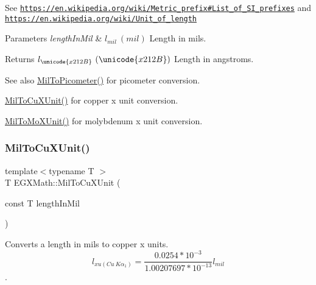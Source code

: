 See \href{https://en.wikipedia.org/wiki/Metric_prefix#List_of_SI_prefixes}{\tt https\+://en.\+wikipedia.\+org/wiki/\+Metric\+\_\+prefix\#\+List\+\_\+of\+\_\+\+S\+I\+\_\+prefixes} and \href{https://en.wikipedia.org/wiki/Unit_of_length}{\tt https\+://en.\+wikipedia.\+org/wiki/\+Unit\+\_\+of\+\_\+length} 
\begin{DoxyParams}{Parameters}
{\em length\+In\+Mil} & $ l_{mil}\ (mil)$ Length in mils. \\
\hline
\end{DoxyParams}
\begin{DoxyReturn}{Returns}
$ l_{\unicode{x212B}}\ (\unicode{x212B})$ Length in angstroms. 
\end{DoxyReturn}
\begin{DoxySeeAlso}{See also}
\mbox{\hyperlink{group___e_g_x_math-_conversions-_length_conversions-_imperial-_mil-_s_i_ga29a85f8ec2e5cf4d963468f882de8447}{Mil\+To\+Picometer()}} for picometer conversion. 

\mbox{\hyperlink{group___e_g_x_math-_conversions-_length_conversions-_imperial-_mil-_non-_s_i_ga92f713e3dddc0a45caa3fc6b5e8ca442}{Mil\+To\+Cu\+X\+Unit()}} for copper x unit conversion. 

\mbox{\hyperlink{group___e_g_x_math-_conversions-_length_conversions-_imperial-_mil-_non-_s_i_ga673efde012cc982641b2eb1266f88f3a}{Mil\+To\+Mo\+X\+Unit()}} for molybdenum x unit conversion. 
\end{DoxySeeAlso}
\mbox{\label{group___e_g_x_math-_conversions-_length_conversions-_imperial-_mil-_non-_s_i_ga92f713e3dddc0a45caa3fc6b5e8ca442}} 
\subsubsection{\texorpdfstring{Mil\+To\+Cu\+X\+Unit()}{MilToCuXUnit()}}
{\footnotesize\ttfamily template$<$typename T $>$ \\
T E\+G\+X\+Math\+::\+Mil\+To\+Cu\+X\+Unit (\begin{DoxyParamCaption}\item[{const T}]{length\+In\+Mil }\end{DoxyParamCaption})}



Converts a length in mils to copper x units. \[ l_{xu(Cu\ K\alpha_1)}=\frac{0.0254 * 10^{-3}}{1.00207697*10^{-13}} l_{mil}\]. 


